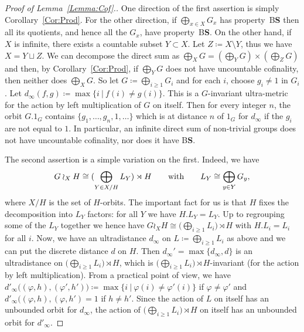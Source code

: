 \documentclass[a4paper]{article}
\theoremstyle{definition}
\newcommand*{\BS}{B\textbf{S}}
\newcommand{\setst}[2]{\{#1\ |\ #2\}}
\begin{document}
\begin{proof}[Proof of Lemma~\ref{Lemma:Cof}.]
One direction of the first assertion is simply Corollary~\ref{Cor:Prod}.
For the other direction, if $\bigoplus_{x\in X}G_x$ has property~\BS{} then all its quotients, and hence all the $G_x$, have property~\BS.
On the other hand, if $X$ is infinite, there exists a countable subset $Y \subset X$. Let $Z \coloneqq X\setminus Y$, thus we have $X = Y \sqcup Z$. We can decompose the direct sum as $\bigoplus_XG = (\bigoplus_YG) \times (\bigoplus_ZG)$ and then, by Corollary~\ref{Cor:Prod}, if $\bigoplus_YG$ does not have uncountable cofinality, then neither does $\bigoplus_XG$.
So let $G\coloneqq \bigoplus_{i\geq 1}G_i$ and for each $i$, choose $g_i\neq 1$ in $G_i$.
Let $d_\infty(f,g)\coloneqq\max\setst{i}{f(i)\neq g(i)}$. %
This is a $G$-invariant ultra-metric for the action by left multiplication of $G$ on itself.
Then for every integer $n$, the orbit $G.1_G$ contains $\{g_1,\dots,g_n,1,\dots\}$ which is at distance $n$ of $1_G$ for $d_\infty$ if the $g_i$ are not equal to $1$.
In particular, an infinite direct sum of non-trivial groups does not have uncountable cofinality, nor does it have \BS.

The second assertion is a simple variation on the first.
Indeed, we have
\[
	G\wr_XH\cong(\bigoplus_{Y\in X/H}L_Y)\rtimes H\qquad\textnormal{with}\qquad L_Y\cong\bigoplus_{y\in Y}G_y,
\]
where $X/H$ is the set of $H$-orbits.
The important fact for us is that $H$ fixes the decomposition into $L_Y$ factors: for all $Y$ we have $H.L_Y=L_Y$.
Up to regrouping some of the $L_Y$ together we hence have $G\wr_XH\cong\bigl(\bigoplus_{i\geq 1}L_i\bigr)\rtimes H$ with $H.L_i=L_i$ for all $i$.
Now, we have an ultradistance $d_\infty$ on $L\coloneqq\bigoplus_{i\geq 1}L_i$ as above and we can put the discrete distance $d$ on $H$.
Then $d_\infty'=\max\{d_\infty,d\}$ is an ultradistance on $\bigl(\bigoplus_{i\geq 1}L_i\bigr)\rtimes H$, which is $\bigl(\bigoplus_{i\geq 1}L_i\bigr)\rtimes H$-invariant (for the action by left multiplication).
From a practical point of view, we have $d'_\infty\bigl((\varphi,h),(\varphi',h')\bigr)\coloneqq\max\setst{i}{\varphi(i)\neq \varphi'(i)}$ if $\varphi\neq \varphi'$ and $d'_\infty\bigl((\varphi,h),(\varphi,h')=1$ if $h\neq h'$.
Since the action of $L$ on itself has an unbounded orbit for $d_\infty$, the action of $\bigl(\bigoplus_{i\geq 1}L_i\bigr)\rtimes H$ on itself has an unbounded orbit for $d'_\infty$.
\end{proof}
%
%
\end{document}
